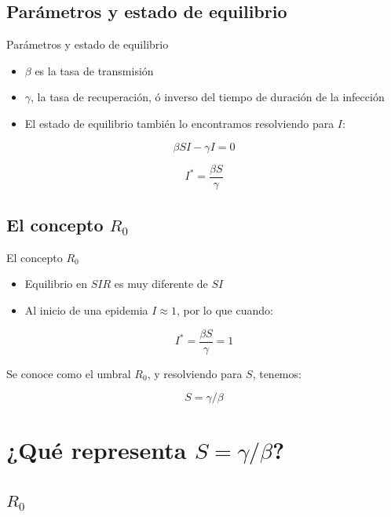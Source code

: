 \documentclass[
  11pt,
  ignorenonframetext,
]{beamer}
\begin{document}
\hypertarget{paruxe1metros-y-estado-de-equilibrio}{%
\subsection{Parámetros y estado de
equilibrio}\label{paruxe1metros-y-estado-de-equilibrio}}

\begin{frame}{Parámetros y estado de equilibrio}
\begin{itemize}
\item
  \(\beta\) es la tasa de transmisión
\item
  \(\gamma\), la tasa de recuperación, ó inverso del tiempo de duración
  de la infección
\item
  El estado de equilibrio también lo encontramos resolviendo para \(I\):
\end{itemize}

\[\beta SI - \gamma I = 0\]

\[I^* = \frac{\beta S}{\gamma}\]
\end{frame}

\hypertarget{el-concepto-r_0}{%
\subsection{\texorpdfstring{El concepto
\(R_0\)}{El concepto R\_0}}\label{el-concepto-r_0}}

\begin{frame}{El concepto \(R_0\)}
\begin{itemize}
\item
  Equilibrio en \(SIR\) es muy diferente de \(SI\)
\item
  Al inicio de una epidemia \(I \approx 1\), por lo que cuando:
\end{itemize}

\[I^* = \frac{\beta S}{\gamma} = 1\]

Se conoce como el umbral \(R_0\), y resolviendo para \(S\), tenemos:

\[S = \gamma/\beta\]
\end{frame}

\hypertarget{quuxe9-representa-s-gammabeta}{%
\section{\texorpdfstring{¿Qué representa
\(S = \gamma/\beta\)?}{¿Qué representa S = \textbackslash gamma/\textbackslash beta?}}\label{quuxe9-representa-s-gammabeta}}

\hypertarget{r_0}{%
\subsection{\texorpdfstring{\(R_0\)}{R\_0}}\label{r_0}}
\end{document}
